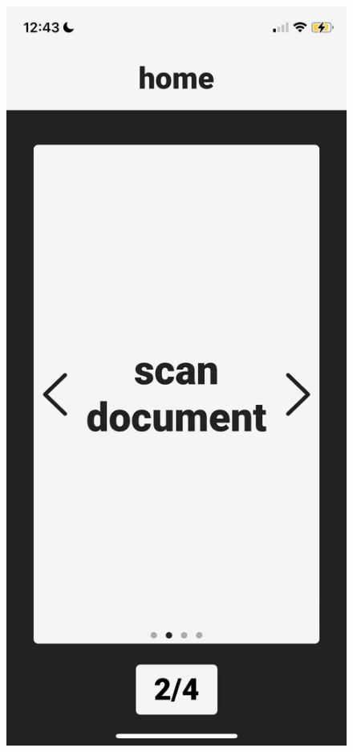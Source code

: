 \documentclass[a4paper,11pt]{article}
\begin{document}
\begin{figure}[H]
\includegraphics[scale=0.1]{img/app/landing2.png}

\end{figure}
\end{document}
